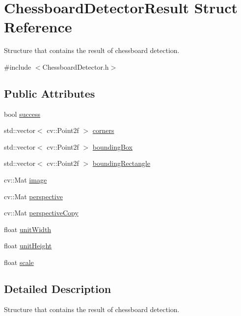 \hypertarget{structChessboardDetectorResult}{}\section{Chessboard\+Detector\+Result Struct Reference}
\label{structChessboardDetectorResult}


Structure that contains the result of chessboard detection.  




{\ttfamily \#include $<$Chessboard\+Detector.\+h$>$}

\subsection*{Public Attributes}
\begin{DoxyCompactItemize}
\item 
bool \hyperlink{structChessboardDetectorResult_a7f5e6c90f4d7b3c948d1e1ddab933df9}{success}
\item 
std\+::vector$<$ cv\+::\+Point2f $>$ \hyperlink{structChessboardDetectorResult_a69a0fd183e694c1fb80bbad1ed2d6833}{corners}
\item 
std\+::vector$<$ cv\+::\+Point2f $>$ \hyperlink{structChessboardDetectorResult_a6887aab98e7283ccfa4a51f8714d5260}{bounding\+Box}
\item 
std\+::vector$<$ cv\+::\+Point2f $>$ \hyperlink{structChessboardDetectorResult_a1c1c71bb678c2eb872d9f8c4ae0a9871}{bounding\+Rectangle}
\item 
cv\+::\+Mat \hyperlink{structChessboardDetectorResult_a9cb87f19e643fa012305b5575720332a}{image}
\item 
cv\+::\+Mat \hyperlink{structChessboardDetectorResult_ae36efe72eb31949739d7ce8905ed2f41}{perspective}
\item 
cv\+::\+Mat \hyperlink{structChessboardDetectorResult_a984f12b2b22c6a34a8147aa7d3d3eff0}{perspective\+Copy}
\item 
float \hyperlink{structChessboardDetectorResult_a967889233f9ea3e34e7b215041105801}{unit\+Width}
\item 
float \hyperlink{structChessboardDetectorResult_a95e32f26ef920afcc1e64af548120285}{unit\+Height}
\item 
float \hyperlink{structChessboardDetectorResult_abf6c377b55ae8db5b653cb581b0baf30}{scale}
\end{DoxyCompactItemize}


\subsection{Detailed Description}
Structure that contains the result of chessboard detection. 

